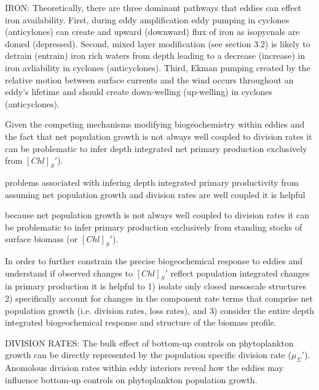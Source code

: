 

IRON: Theoretically, there are three dominant pathways that eddies can effect iron availability. First, during eddy amplification eddy pumping in cyclones (anticylones) can create and upward (downward) flux of iron as isopycnals are domed (depressed). Second, mixed layer modification (see section 3.2) is likely to detrain (entrain) iron rich waters from depth leading to a decrease (increase) in iron avliability in cyclones (anticyclones). Third, Ekman pumping created by the relative motion between surface currents and the wind occurs throughout an eddy's lifetime and should create down-welling (up-welling) in cyclones (anticyclones).

Given the competing mechanisms modifying biogeochemistry within eddies \parencite{McGillicuddyMechanismsPhysicalBiologicalBiogeochemicalInteraction2016} and the fact that net population growth is not always well coupled to division rates \parencite{RohrVariabilitymechanismscontrolling2017,BehrenfeldAnnualcyclesecological2013} it can be problematic to infer depth integrated net primary production exclusively from $[Chl]_{S}'$).

problems associated with infering depth integrated primary productivity from assuming net population growth and division rates are well coupled \parencite{RohrVariabilitymechanismscontrolling2017,BehrenfeldAnnualcyclesecological2013} it is helpful


because net population growth is not always well coupled to division rates \parencite{RohrVariabilitymechanismscontrolling2017,BehrenfeldAnnualcyclesecological2013} it can be problematic to infer primary production exclusively from standing stocks of surface biomass (or $[Chl]_{S}'$).

In order to further constrain the precise biogeochemical response to eddies and understand if observed changes to $[Chl]_{S}'$  reflect population integrated changes in primary production it is helpful to 1) isolate only closed mesoscale structures 2) specifically account for changes in the component rate terms that comprise net population growth (i.e. division rates, loss rates), and 3) consider the entire depth integrated biogeochemical response and structure of the biomass profile.

DIVISION RATES: The bulk effect of bottom-up controls on phytoplankton growth can be directly represented by the population specific division rate ($\mu_\Sigma'$). Anomolous division rates within eddy interiors reveal how the eddies may influence bottom-up controls on phytoplankton population growth.


